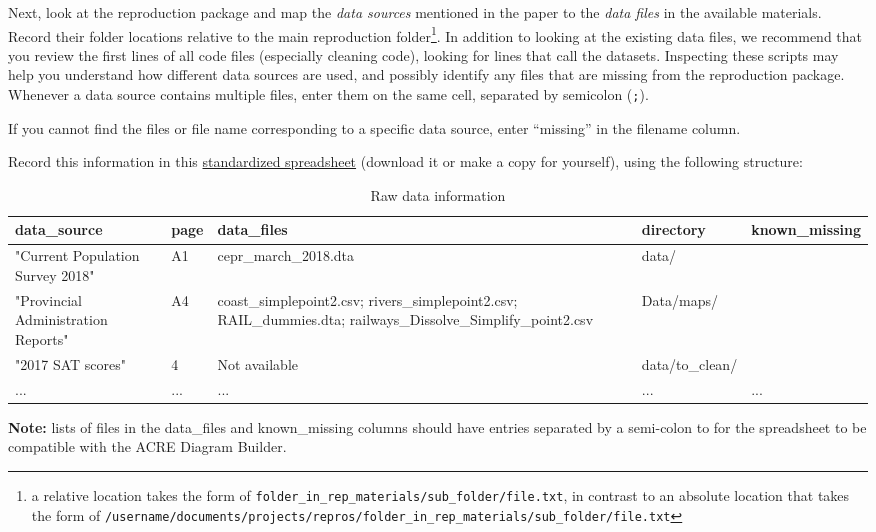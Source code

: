 \documentclass[
]{book}
\begin{document}
Next, look at the reproduction package and map the \emph{data sources} mentioned in the paper to the \emph{data files} in the available materials. Record their folder locations relative to the main reproduction folder\footnote{a relative location takes the form of \texttt{folder\_in\_rep\_materials/sub\_folder/file.txt}, in contrast to an absolute location that takes the form of \texttt{/username/documents/projects/repros/folder\_in\_rep\_materials/sub\_folder/file.txt}}. In addition to looking at the existing data files, we recommend that you review the first lines of all code files (especially cleaning code), looking for lines that call the datasets. Inspecting these scripts may help you understand how different data sources are used, and possibly identify any files that are missing from the reproduction package. Whenever a data source contains multiple files, enter them on the same cell, separated by semicolon (\texttt{;}).

If you cannot find the files or file name corresponding to a specific data source, enter ``missing'' in the filename column.

Record this information in this \href{https://docs.google.com/spreadsheets/d/1LUIdVFH0OfR70C7z07TYeE-uWzKI_JIeWUMaYhqEKK0/edit\#gid=0\&range=A1}{standardized spreadsheet} (download it or make a copy for yourself), using the following structure:\\

\begin{table}

\caption{\label{tab:raw-data-information}Raw data information}
\centering
\begin{tabu} to 
\hline
data\_source & page & data\_files & directory & known\_missing\\
\hline
"Current Population Survey 2018" & A1 & cepr\_march\_2018.dta & data/ & \\
\hline
"Provincial Administration Reports" & A4 & coast\_simplepoint2.csv; rivers\_simplepoint2.csv; RAIL\_dummies.dta; railways\_Dissolve\_Simplify\_point2.csv & Data/maps/ & \\
\hline
"2017 SAT scores" & 4 & Not available & data/to\_clean/ & \\
\hline
... & ... & ... & ... & ...\\
\hline
\end{tabu}
\end{table}

\textbf{Note:} lists of files in the data\_files and known\_missing columns should have entries separated by a semi-colon to for the spreadsheet to be compatible with the ACRE Diagram Builder.
\end{document}
